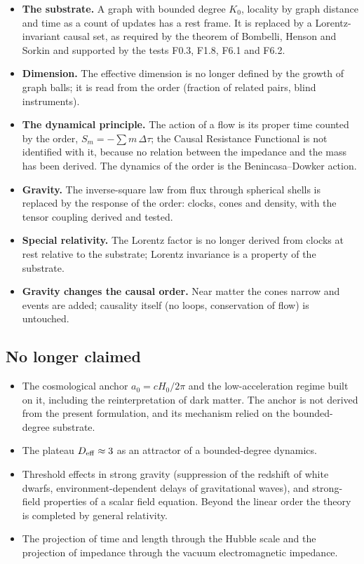 \begin{itemize}
\item \textbf{The substrate.} A graph with bounded degree $K_0$, locality by graph distance and time as a
  count of updates has a rest frame. It is replaced by a Lorentz-invariant causal set, as required by the
  theorem of Bombelli, Henson and Sorkin and supported by the tests F0.3, F1.8, F6.1 and F6.2.
\item \textbf{Dimension.} The effective dimension is no longer defined by the growth of graph balls; it is
  read from the order (fraction of related pairs, blind instruments).
\item \textbf{The dynamical principle.} The action of a flow is its proper time counted by the order,
  $S_m=-\sum m\,\Delta\tau$; the Causal Resistance Functional is not identified with it, because no relation between
  the impedance and the mass has been derived. The dynamics of the order is the Benincasa--Dowker action.
\item \textbf{Gravity.} The inverse-square law from flux through spherical shells is replaced by the
  response of the order: clocks, cones and density, with the tensor coupling derived and tested.
\item \textbf{Special relativity.} The Lorentz factor is no longer derived from clocks at rest relative to
  the substrate; Lorentz invariance is a property of the substrate.
\item \textbf{Gravity changes the causal order.} Near matter the cones narrow and events are added;
  causality itself (no loops, conservation of flow) is untouched.
\end{itemize}

\subsection{No longer claimed}

\begin{itemize}
\item The cosmological anchor $a_0=cH_0/2\pi$ and the low-acceleration regime built on it, including the
  reinterpretation of dark matter. The anchor is not derived from the present formulation, and its
  mechanism relied on the bounded-degree substrate.
\item The plateau $D_{\rm eff}\approx3$ as an attractor of a bounded-degree dynamics.
\item Threshold effects in strong gravity (suppression of the redshift of white dwarfs, environment-dependent
  delays of gravitational waves), and strong-field properties of a scalar field equation. Beyond the
  linear order the theory is completed by general relativity.
\item The projection of time and length through the Hubble scale and the projection of impedance through the
  vacuum electromagnetic impedance.
\end{itemize}

